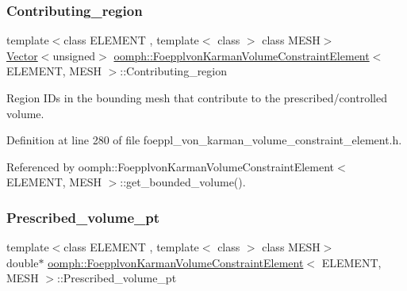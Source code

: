 \subsubsection{\texorpdfstring{Contributing\+\_\+region}{Contributing\_region}}
{\footnotesize\ttfamily template$<$class E\+L\+E\+M\+E\+NT , template$<$ class $>$ class M\+E\+SH$>$ \\
\hyperlink{classoomph_1_1Vector}{Vector}$<$unsigned$>$ \hyperlink{classoomph_1_1FoepplvonKarmanVolumeConstraintElement}{oomph\+::\+Foepplvon\+Karman\+Volume\+Constraint\+Element}$<$ E\+L\+E\+M\+E\+NT, M\+E\+SH $>$\+::Contributing\+\_\+region\hspace{0.3cm}{\ttfamily [protected]}}



Region I\+Ds in the bounding mesh that contribute to the prescribed/controlled volume. 



Definition at line 280 of file foeppl\+\_\+von\+\_\+karman\+\_\+volume\+\_\+constraint\+\_\+element.\+h.



Referenced by oomph\+::\+Foepplvon\+Karman\+Volume\+Constraint\+Element$<$ E\+L\+E\+M\+E\+N\+T, M\+E\+S\+H $>$\+::get\+\_\+bounded\+\_\+volume().

\mbox{\label{classoomph_1_1FoepplvonKarmanVolumeConstraintElement_a47b9920b4fe975f324d6ff0aca6d325b}} 
\subsubsection{\texorpdfstring{Prescribed\+\_\+volume\+\_\+pt}{Prescribed\_volume\_pt}}
{\footnotesize\ttfamily template$<$class E\+L\+E\+M\+E\+NT , template$<$ class $>$ class M\+E\+SH$>$ \\
double$\ast$ \hyperlink{classoomph_1_1FoepplvonKarmanVolumeConstraintElement}{oomph\+::\+Foepplvon\+Karman\+Volume\+Constraint\+Element}$<$ E\+L\+E\+M\+E\+NT, M\+E\+SH $>$\+::Prescribed\+\_\+volume\+\_\+pt\hspace{0.3cm}{\ttfamily [protected]}}



